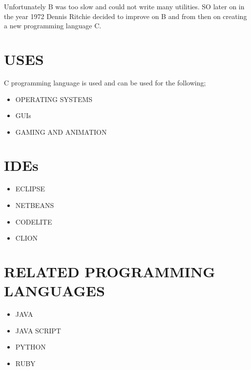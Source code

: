 \documentclass{article}
\begin{document}
	Unfortunately B was too slow and could not write many utilities. 
	SO later on in the year 1972 Dennis Ritchie decided to improve on B and from then on creating a new programming language C.
	\section{USES}
	C programming language is used and can be used for the following;
	\begin{itemize}
		\item OPERATING SYSTEMS 
		\item GUIs
		\item GAMING AND ANIMATION 
	\end{itemize}
\section{IDEs}
\begin{itemize}
	\item ECLIPSE
	\item NETBEANS
	\item CODELITE
	\item CLION
\end{itemize}
\section{RELATED PROGRAMMING LANGUAGES}
\begin{itemize}
	\item JAVA
	\item JAVA SCRIPT
	\item PYTHON
	\item RUBY
\end{itemize}
\end{document}
